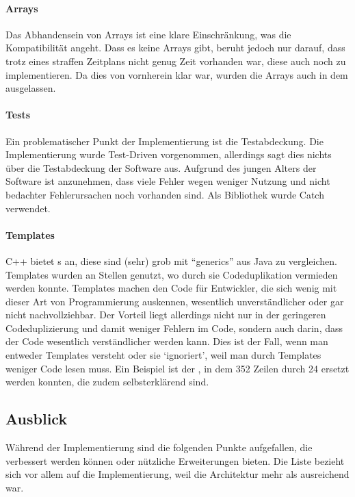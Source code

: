     \paragraph{Arrays}
    Das Abhandensein von Arrays ist eine klare Einschränkung, was die Kompatibilität angeht. Dass es keine Arrays gibt, beruht jedoch nur darauf, dass trotz eines straffen Zeitplans nicht genug Zeit vorhanden war, diese auch noch zu implementieren. Da dies von vornherein klar war, wurden die Arrays auch in dem  ausgelassen.

    \paragraph{Tests}
    Ein problematischer Punkt der Implementierung ist die Testabdeckung. Die Implementierung wurde Test-Driven vorgenommen, allerdings sagt dies nichts über die Testabdeckung der Software aus. Aufgrund des jungen Alters der Software ist anzunehmen, dass viele Fehler wegen weniger Nutzung und nicht bedachter Fehlerursachen noch vorhanden sind. Als Bibliothek wurde Catch \autocite{catch-lib} verwendet.

    \paragraph{Templates}
    C++ bietet s an, diese sind (sehr) grob mit ``generics'' aus Java zu vergleichen. Templates wurden an Stellen genutzt, wo durch sie Codeduplikation vermieden werden konnte. Templates machen den Code für Entwickler, die sich wenig mit dieser Art von Programmierung auskennen, wesentlich unverständlicher oder gar nicht nachvollziehbar. Der Vorteil liegt allerdings nicht nur in der geringeren Codeduplizierung und damit weniger Fehlern im Code, sondern auch darin, dass der Code wesentlich verständlicher werden kann. Dies ist der Fall, wenn man entweder Templates versteht oder sie `ignoriert', weil man durch Templates weniger Code lesen muss. Ein Beispiel ist der , in dem 352 Zeilen durch 24 ersetzt werden konnten, die zudem selbsterklärend sind.

  \subsection{Ausblick}
  \label{ssec:Ausblick}
    Während der Implementierung sind die folgenden Punkte aufgefallen, die verbessert werden können oder nützliche Erweiterungen bieten. Die Liste bezieht sich vor allem auf die Implementierung, weil die Architektur mehr als ausreichend war.

